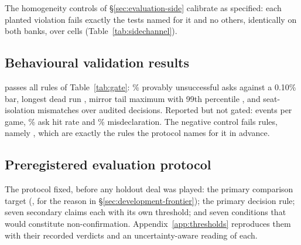 \begin{table}[!ht]\centering
\caption{Calibration of the side-channel controls on holdout material. \emph{Must fail} is the set
the protocol names for each planted violation in advance. It is not one test each: the seed cheat is
visible to two of them. A control failing a test outside its set, or missing one inside it, would
mean the gate does not discriminate.}
\label{tab:sidechannel}
{\tabfont}
\end{table}

The homogeneity controls of \S\ref{sec:evaluation-side} calibrate as specified: each planted violation
fails exactly the tests named for it and no others, identically on both banks, over
\vsevenSideCells{} cells (Table~\ref{tab:sidechannel}).

\subsection{Behavioural validation results}
\label{sec:design-gate}

\sestina{} passes all \vsevenGateRulesWord{} rules of Table~\ref{tab:gate}: \vsevenGateDeadAsks\%
provably unsuccessful asks against a
0.10\% bar, longest dead run \vsevenGateLongestDead{}, mirror tail maximum \vsevenGateTailMax{} with
99th percentile \vsevenGateTailPnn{}, and \vsevenGateSsix{} seat-isolation mismatches over
\vsevenGateSsixNodes{} audited decisions. Reported but not gated: \vsevenGateEvents{} events per game,
\vsevenGateAskHit\% ask hit rate and \vsevenGateMisdecl\% misdeclaration. The negative control fails
\vsevenNegFailCount{} rules, namely \vsevenNegFails{}, which are exactly the rules the protocol names
for it in advance.

\begin{table}[!ht]\centering
\caption{The behavioural validity gate (the protocol's soundness gate), \vsevenGateRulesWord{} rules, run on training material by design. The negative control is
a configuration constructed to be rejected.}
\label{tab:gate}
{\tabfont}
\end{table}

\subsection{Preregistered evaluation protocol}
\label{sec:design-protocol}

The protocol fixed, before any holdout deal was played: the primary comparison target (\fcheap{},
for the reason in \S\ref{sec:development-frontier}); the primary decision rule; seven secondary
claims each with its own threshold; and seven conditions that would constitute non-confirmation.
Appendix~\ref{app:thresholds} reproduces them with their recorded verdicts and an
uncertainty-aware reading of each.

